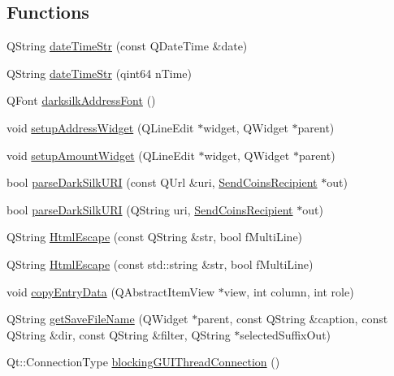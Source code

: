 \subsection*{Functions}
\begin{DoxyCompactItemize}
\item 
Q\+String \hyperlink{namespace_g_u_i_util_aae732a04fea25190081120bf0cc773e8}{date\+Time\+Str} (const Q\+Date\+Time \&date)
\item 
Q\+String \hyperlink{namespace_g_u_i_util_ad182b65c8060da6b6c99b8574820084d}{date\+Time\+Str} (qint64 n\+Time)
\item 
Q\+Font \hyperlink{namespace_g_u_i_util_a41a85267642918f27a9e4bf3cfaf272f}{darksilk\+Address\+Font} ()
\item 
void \hyperlink{namespace_g_u_i_util_a4a230e717c130875bb07f2ef63bbb95c}{setup\+Address\+Widget} (Q\+Line\+Edit $\ast$widget, Q\+Widget $\ast$parent)
\item 
void \hyperlink{namespace_g_u_i_util_a168a2c8d25a022bbd979c0693ce08297}{setup\+Amount\+Widget} (Q\+Line\+Edit $\ast$widget, Q\+Widget $\ast$parent)
\item 
bool \hyperlink{namespace_g_u_i_util_afbb52d0e5aa16b91a37d8ea9b19a842b}{parse\+Dark\+Silk\+U\+R\+I} (const Q\+Url \&uri, \hyperlink{class_send_coins_recipient}{Send\+Coins\+Recipient} $\ast$out)
\item 
bool \hyperlink{namespace_g_u_i_util_a6ae33beeabcd5c1c40129895277687dd}{parse\+Dark\+Silk\+U\+R\+I} (Q\+String uri, \hyperlink{class_send_coins_recipient}{Send\+Coins\+Recipient} $\ast$out)
\item 
Q\+String \hyperlink{namespace_g_u_i_util_a2d4b7f2c11ebc4b97af10bc20d19b1b2}{Html\+Escape} (const Q\+String \&str, bool f\+Multi\+Line)
\item 
Q\+String \hyperlink{namespace_g_u_i_util_ad6086df566cf2cb7f699a24e099dc59c}{Html\+Escape} (const std\+::string \&str, bool f\+Multi\+Line)
\item 
void \hyperlink{namespace_g_u_i_util_aad7852433ad4953a9bcae9a6e735b2d4}{copy\+Entry\+Data} (Q\+Abstract\+Item\+View $\ast$view, int column, int role)
\item 
Q\+String \hyperlink{namespace_g_u_i_util_a788c51092a2255b1f8976d4794fc3ee6}{get\+Save\+File\+Name} (Q\+Widget $\ast$parent, const Q\+String \&caption, const Q\+String \&dir, const Q\+String \&filter, Q\+String $\ast$selected\+Suffix\+Out)
\item 
Qt\+::\+Connection\+Type \hyperlink{namespace_g_u_i_util_a2046fc343a70996c23cae6fe7f8d94f2}{blocking\+G\+U\+I\+Thread\+Connection} ()

\end{DoxyCompactItemize}
